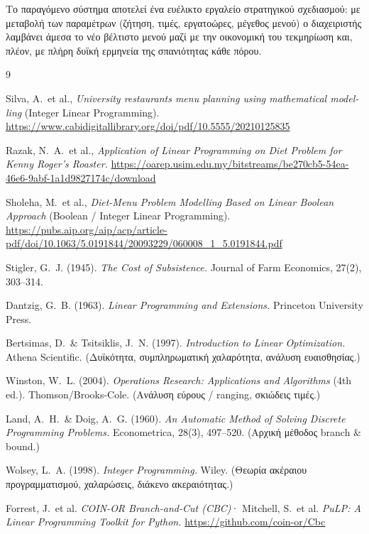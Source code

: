 \documentclass[11pt,a4paper]{article}
\newcommand{\en}[1]{\textenglish{#1}}
\begin{document}
Το παραγόμενο σύστημα αποτελεί ένα ευέλικτο εργαλείο στρατηγικού σχεδιασμού: με
μεταβολή των παραμέτρων (ζήτηση, τιμές, εργατοώρες, μέγεθος μενού) ο διαχειριστής
λαμβάνει άμεσα το νέο βέλτιστο μενού μαζί με την οικονομική του τεκμηρίωση και,
πλέον, με πλήρη δυϊκή ερμηνεία της σπανιότητας κάθε πόρου.

\begin{thebibliography}{9}

 \en{Silva, A.\ et al., \textit{University restaurants menu planning
using mathematical modelling} (Integer Linear Programming).}
\url{https://www.cabidigitallibrary.org/doi/pdf/10.5555/20210125835}

 \en{Razak, N.\ A.\ et al., \textit{Application of Linear Programming
on Diet Problem for Kenny Roger's Roaster.}}
\url{https://oarep.usim.edu.my/bitstreams/be270cb5-54ea-46e6-9abf-1a1d9827174c/download}

 \en{Sholeha, M.\ et al., \textit{Diet-Menu Problem Modelling Based
on Linear Boolean Approach} (Boolean / Integer Linear Programming).}
\url{https://pubs.aip.org/aip/acp/article-pdf/doi/10.1063/5.0191844/20093229/060008_1_5.0191844.pdf}

 \en{Stigler, G.\ J. (1945). \textit{The Cost of Subsistence.}
Journal of Farm Economics, 27(2), 303--314.}

 \en{Dantzig, G.\ B. (1963). \textit{Linear Programming and
Extensions.} Princeton University Press.}

 \en{Bertsimas, D.\ \& Tsitsiklis, J.\ N. (1997).
\textit{Introduction to Linear Optimization.} Athena Scientific.} (Δυϊκότητα,
συμπληρωματική χαλαρότητα, ανάλυση ευαισθησίας.)

 \en{Winston, W.\ L. (2004). \textit{Operations Research:
Applications and Algorithms} (4th ed.). Thomson/Brooks-Cole.} (Ανάλυση εύρους /
\en{ranging}, σκιώδεις τιμές.)

 \en{Land, A.\ H.\ \& Doig, A.\ G. (1960). \textit{An Automatic
Method of Solving Discrete Programming Problems.} Econometrica, 28(3), 497--520.}
(Αρχική μέθοδος \en{branch \& bound}.)

 \en{Wolsey, L.\ A. (1998). \textit{Integer Programming.} Wiley.}
(Θεωρία ακέραιου προγραμματισμού, χαλαρώσεις, διάκενο ακεραιότητας.)

 \en{Forrest, J.\ et al. \textit{COIN-OR Branch-and-Cut (CBC)}·
Mitchell, S.\ et al. \textit{PuLP: A Linear Programming Toolkit for Python.}}
\url{https://github.com/coin-or/Cbc}

\end{thebibliography}
\end{document}
